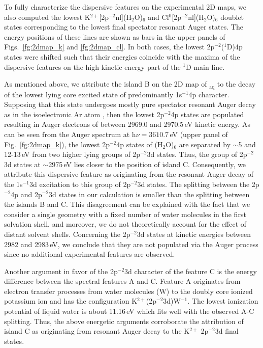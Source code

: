 To fully characterize the dispersive features on the experimental 2D maps, we also computed the lowest K$^{2+}$[2p$^{-2}$nl](H$_2$O)$_6$ and Cl$^{0}$[2p$^{-2}$nl](H$_2$O)$_6$ doublet states corresponding to the lowest final spectator resonant Auger states. The energy positions of these lines are shown as bars in the upper panels of Figs.\ \ref{fg:2dmap_k} and \ref{fg:2dmap_cl}. In both cases, the lowest 2p$^{-2}$($^1$D)4p states were shifted such that their energies coincide with the maxima of the dispersive features on the high kinetic energy part of the $^1$D main line.

As mentioned above, we attribute the island B on the 2D map of \ki$_{\text{aq}}$ to the decay of the lowest lying core excited state of predominantly 1s$^{-1}$4p character. Supposing that this state undergoes mostly pure spectator resonant Auger decay as in the isoelectronic Ar atom \citep{ceolin15:022502}, then the lowest 2p$^{-2}$4p states are populated resulting in Auger electrons of between 2969.0 and 2970.5\,eV kinetic energy. As can be seen from the Auger spectrum at h$\nu = 3610.7$\,eV (upper panel of Fig.\ \ref{fg:2dmap_k}), the lowest 2p$^{-2}$4p states of \ki(H$_2$O)$_6$ are separated by $\sim$5 and 12-13\,eV from two higher lying groups of 2p$^{-2}$3d states. Thus, the group of 2p$^{-2}$3d states at $\sim$2975\,eV lies closer to the position of island C. Consequently, we attribute this dispersive feature as originating from the resonant Auger decay of the 1s$^{-1}$3d excitation to this group of 2p$^{-2}$3d states. The splitting between the 2p$^{-2}$4p and 2p$^{-2}$3d states in our calculation is smaller than the splitting between the islands B and C. This disagreement can be explained with the fact that we consider a single geometry with a fixed number of water molecules in the first solvation shell, and moreover, we do not theoretically account for the effect of distant solvent shells. Concerning the 2p$^{-2}$3d states at kinetic energies between 2982 and 2983\,eV, we conclude that they are not populated via the Auger process since no additional experimental features are observed.


Another argument in favor of the 2p$^{-2}$3d character of the feature C is the energy difference between the spectral features A and C. Feature A originates from electron transfer processes from water molecules (W) to the doubly core ionized potassium ion and has the configuration K$^{2+}$(2p$^{-2}$3d)W$^{-1}$. The lowest ionization potential of liquid water is about 11.16\,eV \cite{winter04:2625} which fits well with the observed A-C splitting. Thus, the above energetic arguments corroborate the attribution of island C as originating from resonant Auger decay to the K$^{2+}$ 2p$^{-2}$3d final states.


